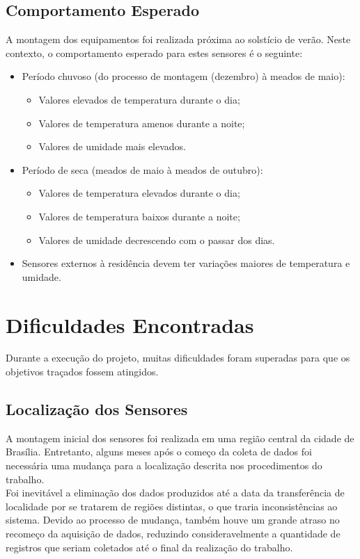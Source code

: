
\subsection{Comportamento Esperado}
\quad A montagem dos equipamentos foi realizada próxima ao solstício de verão. Neste contexto, o comportamento esperado para estes sensores é o seguinte:
\begin{itemize}
  \item Período chuvoso (do processo de montagem (dezembro) à meados de maio):
  \begin{itemize}
    \item Valores elevados de temperatura durante o dia;
    \item Valores de temperatura amenos durante a noite;
    \item Valores de umidade mais elevados.

  \end{itemize}
  \item Período de seca (meados de maio à meados de outubro):
  \begin{itemize}
    \item Valores de temperatura elevados durante o dia;
    \item Valores de temperatura baixos durante a noite;
    \item Valores de umidade decrescendo com o passar dos dias.
  \end{itemize}
  \item Sensores externos à residência devem ter variações maiores de temperatura e umidade.
\end{itemize}

\section{Dificuldades Encontradas}
\label{sec:dificuldades}
\quad Durante a execução do projeto, muitas dificuldades foram superadas para que os objetivos traçados fossem atingidos.
\subsection{Localização dos Sensores}
\quad A montagem inicial dos sensores foi realizada em uma região central da cidade de Brasília. Entretanto, alguns meses após o começo da coleta de dados foi necessária uma mudança para a localização descrita nos procedimentos do trabalho.
\\\null \quad Foi inevitável a eliminação dos dados produzidos até a data da transferência de localidade por se tratarem de regiões distintas, o que traria inconsistências ao sistema. Devido ao processo de mudança, também houve um grande atraso no recomeço da aquisição de dados, reduzindo consideravelmente a quantidade de registros que seriam coletados até o final da realização do trabalho.

